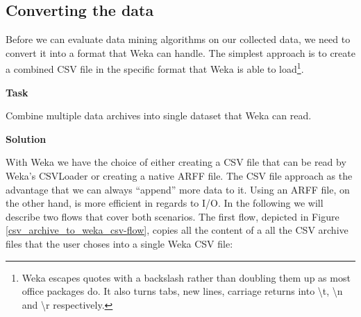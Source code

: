 \documentclass[a4paper,10pt]{book}
\newcommand{\heading}[1]{
  \vspace{0.3cm} \noindent \textbf{#1} \newline
}
\begin{document}
\subsection{Converting the data}
Before we can evaluate data mining algorithms on our collected data, we need to convert it into a format that Weka can handle. The simplest approach is to create a combined CSV file in the specific format that Weka is able to load\footnote{Weka escapes quotes with a backslash rather than doubling them up as most office packages do. It also turns tabs, new lines, carriage returns into \textbackslash t, \textbackslash n and \textbackslash r respectively.}.

\heading{Task}
Combine multiple data archives into single dataset that Weka can read.

\heading{Solution}
With Weka we have the choice of either creating a CSV file that can be read by Weka's CSVLoader or creating a native ARFF file. The CSV file approach as the advantage that we can always ``append'' more data to it. Using an ARFF file, on the other hand, is more efficient in regards to I/O. In the following we will describe two flows that cover both scenarios.
The first flow, depicted in Figure \ref{csv_archive_to_weka_csv-flow}, copies all the content of a all the CSV archive files that the user choses into a single Weka CSV file:
\end{document}

